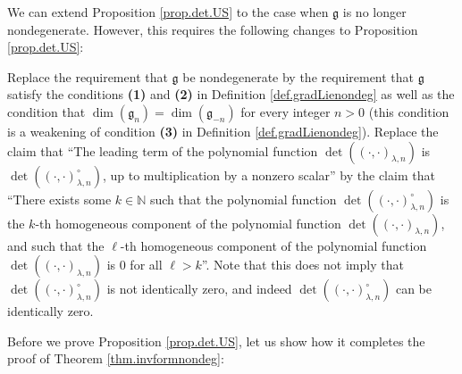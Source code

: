 \documentclass[etingof-lie.tex]{subfiles}
\begin{document}
\begin{remark}
We can extend Proposition \ref{prop.det.US} to the case when $\mathfrak{g}$ is
no longer nondegenerate. However, this requires the following changes to
Proposition \ref{prop.det.US}:

Replace the requirement that $\mathfrak{g}$ be nondegenerate by the
requirement that $\mathfrak{g}$ satisfy the conditions \textbf{(1)} and
\textbf{(2)} in Definition \ref{def.gradLienondeg} as well as the condition
that $\dim\left(  \mathfrak{g}_{n}\right)  =\dim\left(  \mathfrak{g}%
_{-n}\right)  $ for every integer $n>0$ (this condition is a weakening of
condition \textbf{(3)} in Definition \ref{def.gradLienondeg}). Replace the
claim that ``The leading term of the polynomial function $\det\left(  \left(
\cdot,\cdot\right)  _{\lambda,n}\right)  $ is $\det\left(  \left(  \cdot
,\cdot\right)  _{\lambda,n}^{\circ}\right)  $, up to multiplication by a
nonzero scalar'' by the claim that ``There exists some $k\in\mathbb{N}$ such
that the polynomial function $\det\left(  \left(  \cdot,\cdot\right)
_{\lambda,n}^{\circ}\right)  $ is the $k$-th homogeneous component of the
polynomial function $\det\left(  \left(  \cdot,\cdot\right)  _{\lambda
,n}\right)  $, and such that the $\ell$-th homogeneous component of the
polynomial function $\det\left(  \left(  \cdot,\cdot\right)  _{\lambda
,n}\right)  $ is $0$ for all $\ell>k$''. Note that this does not imply that
$\det\left(  \left(  \cdot,\cdot\right)  _{\lambda,n}^{\circ}\right)  $ is not
identically zero, and indeed $\det\left(  \left(  \cdot,\cdot\right)
_{\lambda,n}^{\circ}\right)  $ can be identically zero.
\end{remark}

Before we prove Proposition \ref{prop.det.US}, let us show how it completes
the proof of Theorem \ref{thm.invformnondeg}:
\end{document}
